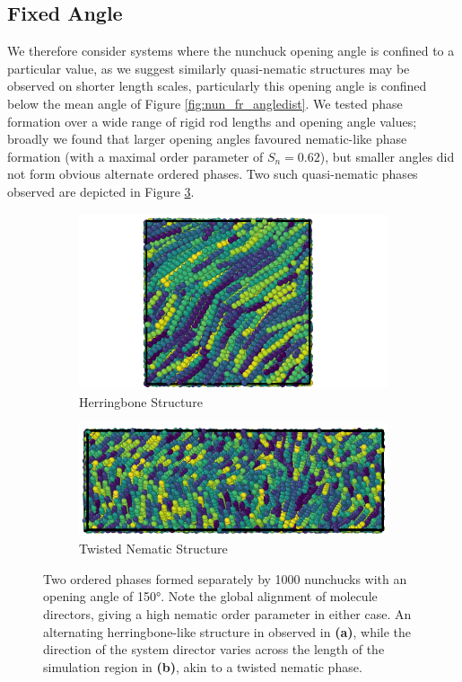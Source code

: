 \documentclass[11pt, a4paper]{article} %
\begin{document}
\subsection{Fixed Angle}
We therefore consider systems where the nunchuck opening angle is confined to a particular value, as we suggest similarly quasi-nematic structures may be observed on shorter length scales,  particularly this opening angle is confined below the mean angle of Figure \ref{fig:nun_fr_angledist}.
We tested phase formation over a wide range of rigid rod lengths and opening angle values; broadly we found that larger opening angles favoured nematic-like phase formation (with a maximal order parameter of $S_{n} = 0.62$), but smaller angles did not form obvious alternate ordered phases. Two such quasi-nematic phases observed are depicted in Figure \ref{fig:nun_fa_views}.

\begin{figure}
	\vspace{0.5cm}
	\centering
	\begin{subfigure}{.4\textwidth}
		\centering
		\includegraphics[width=.9\linewidth]{Figures/nun_fa_herringbone}
		\caption{Herringbone Structure}
		\label{fig:nun_fa_herringbone}
	\end{subfigure}%
	\begin{subfigure}{.6\textwidth}
		\centering
		\includegraphics[width=.9\linewidth]{Figures/nun_fa_twist}
		\caption{Twisted Nematic Structure}
		\label{fig:nun_fa_twist}
	\end{subfigure}
	\caption{Two ordered phases formed separately by \num{1000} nunchucks with an opening angle of \ang{150}. Note the global alignment of molecule directors, giving a high nematic order parameter in either case. An alternating herringbone-like structure in observed in \textbf{(a)}, while the direction of the system director varies across the length of the simulation region in \textbf{(b)}, akin to a twisted nematic phase.}
	\label{fig:nun_fa_views}
\end{figure}
\end{document}
